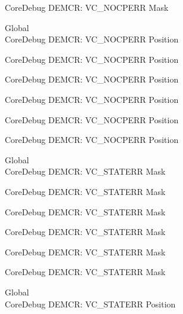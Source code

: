 \begin{DoxyRefList}
\label{deprecated__deprecated000619}%
%
Core\+Debug DEMCR\+: VC\+\_\+\+NOCPERR Mask  
\item[Global \doxylink{group___c_m_s_i_s___core_debug_gac9d13eb2add61f610d5ced1f7ad2adf8}{Core\+Debug\+\_\+\+DEMCR\+\_\+\+VC\+\_\+\+NOCPERR\+\_\+\+Pos} ]\hfill \\
\label{deprecated__deprecated000065}%
%
Core\+Debug DEMCR\+: VC\+\_\+\+NOCPERR Position 

\label{deprecated__deprecated000209}%
%
Core\+Debug DEMCR\+: VC\+\_\+\+NOCPERR Position 

\label{deprecated__deprecated000351}%
%
Core\+Debug DEMCR\+: VC\+\_\+\+NOCPERR Position 

\label{deprecated__deprecated000427}%
%
Core\+Debug DEMCR\+: VC\+\_\+\+NOCPERR Position 

\label{deprecated__deprecated000516}%
%
Core\+Debug DEMCR\+: VC\+\_\+\+NOCPERR Position 

\label{deprecated__deprecated000618}%
%
Core\+Debug DEMCR\+: VC\+\_\+\+NOCPERR Position  
\item[Global \doxylink{group___c_m_s_i_s___core_debug_gaa38b947d77672c48bba1280c0a642e19}{Core\+Debug\+\_\+\+DEMCR\+\_\+\+VC\+\_\+\+STATERR\+\_\+\+Msk} ]\hfill \\
\label{deprecated__deprecated000062}%
%
Core\+Debug DEMCR\+: VC\+\_\+\+STATERR Mask 

\label{deprecated__deprecated000206}%
%
Core\+Debug DEMCR\+: VC\+\_\+\+STATERR Mask 

\label{deprecated__deprecated000348}%
%
Core\+Debug DEMCR\+: VC\+\_\+\+STATERR Mask 

\label{deprecated__deprecated000424}%
%
Core\+Debug DEMCR\+: VC\+\_\+\+STATERR Mask 

\label{deprecated__deprecated000513}%
%
Core\+Debug DEMCR\+: VC\+\_\+\+STATERR Mask 

\label{deprecated__deprecated000615}%
%
Core\+Debug DEMCR\+: VC\+\_\+\+STATERR Mask  
\item[Global \doxylink{group___c_m_s_i_s___core_debug_ga16f0d3d2ce1e1e8cd762d938ac56c4ac}{Core\+Debug\+\_\+\+DEMCR\+\_\+\+VC\+\_\+\+STATERR\+\_\+\+Pos} ]\hfill \\
\label{deprecated__deprecated000061}%
%
Core\+Debug DEMCR\+: VC\+\_\+\+STATERR Position 


\end{DoxyRefList}
